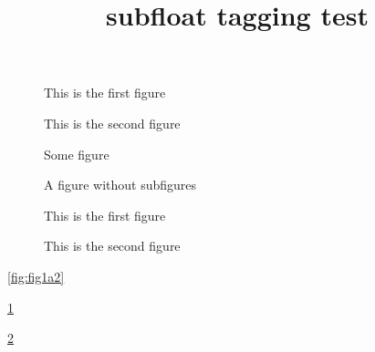 \documentclass{article}
\title{subfloat tagging test}
\begin{document}
\begin{subfigures}
\label{fig:fig1a2}
%
\begin{figure}\centering
{}
\caption{This is the first figure}\label{fig:fig1}
\end{figure}
%
\begin{figure}\centering
{}
\caption{This is the second figure}\label{fig:fig2}
\end{figure}
%
\end{subfigures}

\begin{figure}
Some figure
\caption{A figure without subfigures}
\end{figure}

\begin{subfigures}
\label{fig2:fig1a2}
%
\begin{figure}\centering
{}
\caption{This is the first figure}\label{fig2:fig1}
\end{figure}
%
\begin{figure}\centering
{}
\caption{This is the second figure}\label{fig2:fig2}
\end{figure}
%
\end{subfigures}

\ref{fig:fig1a2}

\ref{fig:fig1}

\ref{fig:fig2}
\end{document}
